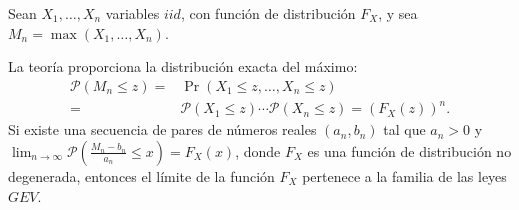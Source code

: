 \begin{f} 
	
	Sean \(X_1, \dots, X_n\) variables \(iid\), con función de distribución \(F_X\), y sea \(M_n =\max(X_1,\dots,X_n)\).
	
	La teoría proporciona la distribución exacta del máximo:
	\begin{align*}
		\mathcal{P}(M_n \leq z) = &\Pr(X_1 \leq z, \dots, X_n \leq z) \\
		= &\mathcal{P}(X_1 \leq z) \cdots \mathcal{P}(X_n \leq z) = (F_X(z))^n. 
	\end{align*}
	Si existe una secuencia de pares de números reales \((a_n, b_n)\) tal que \(a_n>0\) y \(\lim_{n \to \infty}\mathcal{P}\left(\frac{M_n-b_n}{a_n}\leq x\right) = F_X(x)\), donde \(F_X\) es una función de distribución no degenerada, entonces el límite de la función \(F_X\) pertenece a la familia de las leyes \(GEV\). 
	
\end{f}

